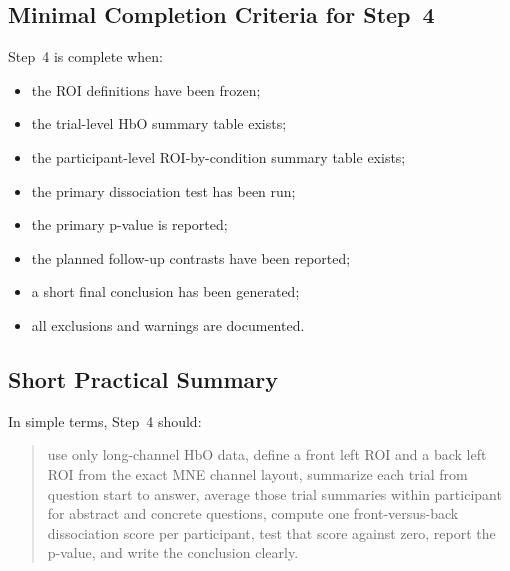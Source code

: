 \subsection{Minimal Completion Criteria for Step~4}
Step~4 is complete when:
\begin{itemize}
    \item the ROI definitions have been frozen;
    \item the trial-level HbO summary table exists;
    \item the participant-level ROI-by-condition summary table exists;
    \item the primary dissociation test has been run;
    \item the primary p-value is reported;
    \item the planned follow-up contrasts have been reported;
    \item a short final conclusion has been generated;
    \item all exclusions and warnings are documented.
\end{itemize}

\subsection{Short Practical Summary}
In simple terms, Step~4 should:
\begin{quote}
use only long-channel HbO data, define a front left ROI and a back left ROI from the exact MNE channel
layout, summarize each trial from question start to answer, average those trial summaries within participant
for abstract and concrete questions, compute one front-versus-back dissociation score per participant,
test that score against zero, report the p-value, and write the conclusion clearly.
\end{quote}
